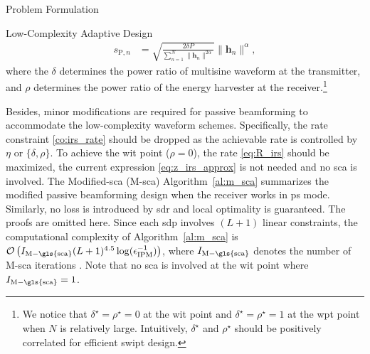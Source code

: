 \begin{section}{Problem Formulation}
\begin{subsection}{Low-Complexity Adaptive Design}
\begin{align}
			s_{\mathrm{P}, n} &= \sqrt{\frac{2 \delta P}{\sum_{n=1}^N \lVert{\boldsymbol{h}_n \rVert^{2 \alpha}}}}\lVert{\boldsymbol{h}_n}\rVert^\alpha, \label{eq:s_p}
		\end{align}
		where the $\delta$ determines the power ratio of multisine waveform at the transmitter, and $\rho$ determines the power ratio of the energy harvester at the receiver.\footnote{We notice that $\delta^{\star}=\rho^{\star}=0$ at the \gls{wit} point and $\delta^{\star}=\rho^{\star}=1$ at the \gls{wpt} point when $N$ is relatively large. Intuitively, $\delta^{\star}$ and $\rho^{\star}$ should be positively correlated for efficient \gls{swipt} design.}

		Besides, minor modifications are required for passive beamforming to accommodate the low-complexity waveform schemes. Specifically, the rate constraint \eqref{co:irs_rate} should be dropped as the achievable rate is controlled by $\eta$ or $\{\delta,\rho\}$. To achieve the \gls{wit} point ($\rho=0$), the rate \eqref{eq:R_irs} should be maximized, the current expression \eqref{eq:z_irs_approx} is not needed and no \gls{sca} is involved. The Modified-\gls{sca} (M-\gls{sca}) Algorithm~\ref{al:m_sca} summarizes the modified passive beamforming design when the receiver works in \gls{ps} mode. Similarly, no loss is introduced by \gls{sdr} and local optimality is guaranteed. The proofs are omitted here. Since each \gls{sdp} involves $(L+1)$ linear constraints, the computational complexity of Algorithm~\ref{al:m_sca} is $\mathcal{O}\left(I_{\mathrm{M-\gls{sca}}}(L+1)^{4.5} \log(\epsilon_{\mathrm{IPM}}^{-1})\right)$, where $I_{\mathrm{M-\gls{sca}}}$ denotes the number of M-\gls{sca} iterations \cite{Luo2010b}. Note that no \gls{sca} is involved at the \gls{wit} point where $I_{\mathrm{M-\gls{sca}}}=1$.


\end{subsection}
\end{section}

